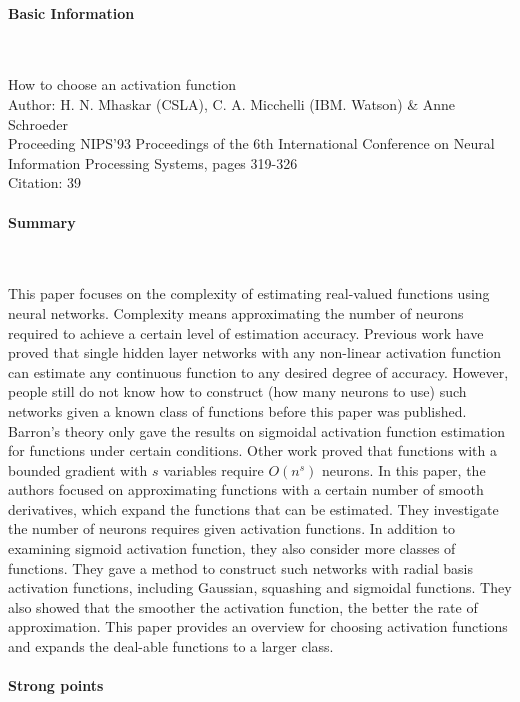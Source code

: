 \documentclass{article}
\begin{document}
\thispagestyle{empty}

\paragraph{Basic Information}  \  

How to choose an activation function\\
Author: H. N. Mhaskar (CSLA), C. A. Micchelli (IBM. Watson) \& Anne Schroeder\\
Proceeding NIPS'93 Proceedings of the 6th International Conference on Neural Information Processing Systems, pages 319-326 \\
Citation: 39

\paragraph{Summary}  \  

This paper focuses on the complexity of estimating real-valued functions using neural networks. Complexity means approximating the number of neurons required to achieve a certain level of estimation accuracy. Previous work have proved that single hidden layer networks with any non-linear activation function can estimate any continuous function to any desired degree of accuracy. However, people still do not know how to construct (how many neurons to use) such networks given a known class of functions before this paper was published. Barron's theory only gave the results on sigmoidal activation function estimation for functions under certain conditions. Other work proved that functions with a bounded gradient with $s$ variables require $O(n^s)$ neurons. In this paper, the authors focused on approximating functions with a certain number of smooth derivatives, which expand the functions that can be estimated. They investigate the number of neurons requires given activation functions. In addition to examining sigmoid activation function, they also consider more classes of functions. They gave a method to construct such networks with radial basis activation functions, including Gaussian, squashing and sigmoidal functions. They also showed that the smoother the activation function, the better the rate of approximation. This paper provides an overview for choosing activation functions and expands the deal-able functions to a larger class.

\paragraph{Strong points}  \  
\end{document}

